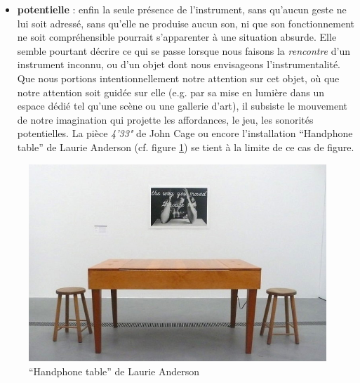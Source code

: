 \begin{itemize}[noitemsep]
	\item \textbf{potentielle} : enfin la seule présence de l'instrument, sans qu'aucun geste ne lui soit adressé, sans qu'elle ne produise aucun son, ni que son fonctionnement ne soit compréhensible pourrait s'apparenter à une situation absurde. Elle semble pourtant décrire ce qui se passe lorsque nous faisons la \textit{rencontre} d'un instrument inconnu, ou d'un objet dont nous envisageons l'instrumentalité. Que nous portions intentionnellement notre attention sur cet objet, où que notre attention soit guidée sur elle (e.g. par sa mise en lumière dans un espace dédié tel qu'une scène ou une gallerie d'art), il subsiste le mouvement de notre imagination qui projette les affordances, le jeu, les sonorités potentielles. La pièce \textit{4'33"} de John Cage ou encore l'installation ``Handphone table'' de Laurie Anderson (cf. figure \ref{fig:gesture:HandphoneTable}) se tient à la limite de ce cas de figure.
\end{itemize}

\begin{figure}[!htbp]
	\captionsetup{format=plain}%
	\centering
	\begin{minipage}[t]{0.8\textwidth}
		\includegraphics[width=\linewidth]{gfx/03_gesture/LaurieAnderson-HandphoneTable-PhotoLuisaRibas.jpg}
		\caption[``Handphone table'' de Laurie Anderson]{``Handphone table'' de Laurie Anderson}
		\label{fig:gesture:HandphoneTable}
	\end{minipage}
\end{figure}

